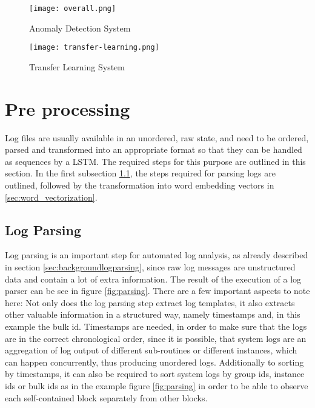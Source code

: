\begin{figure}[H]
	\centering
	\texttt{[image: overall.png]}
	\caption{Anomaly Detection System}
	\label{fig:overall_system}
\end{figure}

\begin{figure}[H]
	\centering
	\texttt{[image: transfer-learning.png]}
	\caption{Transfer Learning System}
	\label{fig:overall_system}
\end{figure}

\section{Pre processing \label{sec:pre_processing}}
Log files are usually available in an unordered, raw state, and need to be ordered, parsed and transformed into an appropriate format so that they can be handled as sequences by a LSTM. The required steps for this purpose are outlined in this section. In the first subsection \ref{sec:conceptlogparsing}, the steps required for parsing logs are outlined, followed by the transformation into word embedding vectors in \ref{sec:word_vectorization}.

\subsection{Log Parsing}\label{sec:conceptlogparsing}
Log parsing is an important step for automated log analysis, as already described in section \ref{sec:backgroundlogparsing}, since raw log messages are unstructured data and contain a lot of extra information. The result of the execution of a log parser can be see in figure \ref{fig:parsing}. There are a few important aspects to note here: Not only does the log parsing step extract log templates, it also extracts other valuable information in a structured way, namely timestamps and, in this example the bulk id. Timestamps are needed, in order to make sure that the logs are in the correct chronological order, since it is possible, that system logs are an aggregation of log output of different sub-routines or different instances, which can happen concurrently, thus producing unordered logs. Additionally to sorting by timestamps, it can also be required to sort system logs by group ids, instance ids or bulk ids as in the example figure \ref{fig:parsing} in order to be able to observe each self-contained block separately from other blocks.

